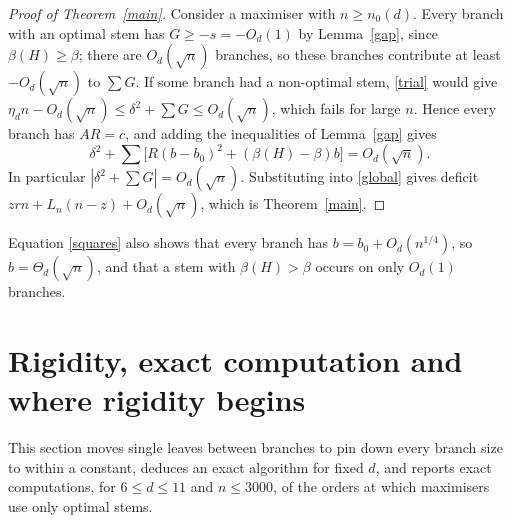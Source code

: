 \documentclass[11pt,a4paper]{article}
\theoremstyle{remark}
\begin{document}
\begin{proof}[Proof of Theorem~\ref{main}]
Consider a maximiser with $n\ge n_0(d)$. Every branch with an optimal stem has $G\ge-s=-O_d(1)$ by Lemma~\ref{gap}, since $\beta(H)\ge\beta$; there are $O_d(\sqrt n)$ branches, so these branches contribute at least $-O_d(\sqrt n)$ to $\sum G$. If some branch had a non-optimal stem, \eqref{trial} would give $\eta_dn-O_d(\sqrt n)\le\delta^2+\sum G\le O_d(\sqrt n)$, which fails for large $n$. Hence every branch has $AR=c$, and adding the inequalities of Lemma~\ref{gap} gives
\begin{equation}
 \delta^2+\sum\big[R(b-b_0)^2+(\beta(H)-\beta)b\big]=O_d(\sqrt n).
 \label{squares}
\end{equation}
In particular $|\delta^2+\sum G|=O_d(\sqrt n)$. Substituting into \eqref{global} gives deficit $zrn+L_n(n-z)+O_d(\sqrt n)$, which is Theorem~\ref{main}.
\end{proof}

Equation \eqref{squares} also shows that every branch has $b=b_0+O_d(n^{1/4})$, so $b=\Theta_d(\sqrt n)$, and that a stem with $\beta(H)>\beta$ occurs on only $O_d(1)$ branches.

\section{Rigidity, exact computation and where rigidity begins}\label{sec:exchange}
This section moves single leaves between branches to pin down every branch size to within a constant, deduces an exact algorithm for fixed $d$, and reports exact computations, for $6\le d\le11$ and $n\le3000$, of the orders at which maximisers use only optimal stems.
\end{document}
